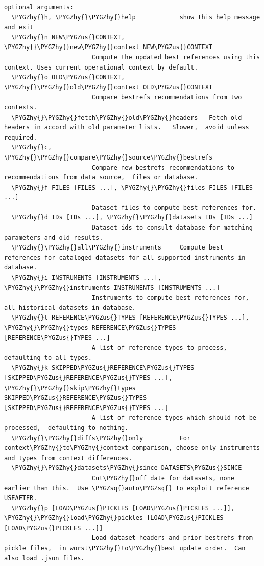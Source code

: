 \documentclass[letterpaper,10pt,english]{sphinxmanual}
\def\PYGZus{\char`\_}
\def\PYGZhy{\char`\-}
\def\PYGZsq{\char`\'}
\begin{document}
\begin{Verbatim}[commandchars=\\\{\}]
optional arguments:
  \PYGZhy{}h, \PYGZhy{}\PYGZhy{}help            show this help message and exit
  \PYGZhy{}n NEW\PYGZus{}CONTEXT, \PYGZhy{}\PYGZhy{}new\PYGZhy{}context NEW\PYGZus{}CONTEXT
                        Compute the updated best references using this context. Uses current operational context by default.
  \PYGZhy{}o OLD\PYGZus{}CONTEXT, \PYGZhy{}\PYGZhy{}old\PYGZhy{}context OLD\PYGZus{}CONTEXT
                        Compare bestrefs recommendations from two contexts.
  \PYGZhy{}\PYGZhy{}fetch\PYGZhy{}old\PYGZhy{}headers   Fetch old headers in accord with old parameter lists.   Slower,  avoid unless required.
  \PYGZhy{}c, \PYGZhy{}\PYGZhy{}compare\PYGZhy{}source\PYGZhy{}bestrefs
                        Compare new bestrefs recommendations to recommendations from data source,  files or database.
  \PYGZhy{}f FILES [FILES ...], \PYGZhy{}\PYGZhy{}files FILES [FILES ...]
                        Dataset files to compute best references for.
  \PYGZhy{}d IDs [IDs ...], \PYGZhy{}\PYGZhy{}datasets IDs [IDs ...]
                        Dataset ids to consult database for matching parameters and old results.
  \PYGZhy{}\PYGZhy{}all\PYGZhy{}instruments     Compute best references for cataloged datasets for all supported instruments in database.
  \PYGZhy{}i INSTRUMENTS [INSTRUMENTS ...], \PYGZhy{}\PYGZhy{}instruments INSTRUMENTS [INSTRUMENTS ...]
                        Instruments to compute best references for, all historical datasets in database.
  \PYGZhy{}t REFERENCE\PYGZus{}TYPES [REFERENCE\PYGZus{}TYPES ...], \PYGZhy{}\PYGZhy{}types REFERENCE\PYGZus{}TYPES [REFERENCE\PYGZus{}TYPES ...]
                        A list of reference types to process,  defaulting to all types.
  \PYGZhy{}k SKIPPED\PYGZus{}REFERENCE\PYGZus{}TYPES [SKIPPED\PYGZus{}REFERENCE\PYGZus{}TYPES ...], \PYGZhy{}\PYGZhy{}skip\PYGZhy{}types SKIPPED\PYGZus{}REFERENCE\PYGZus{}TYPES [SKIPPED\PYGZus{}REFERENCE\PYGZus{}TYPES ...]
                        A list of reference types which should not be processed,  defaulting to nothing.
  \PYGZhy{}\PYGZhy{}diffs\PYGZhy{}only          For context\PYGZhy{}to\PYGZhy{}context comparison, choose only instruments and types from context differences.
  \PYGZhy{}\PYGZhy{}datasets\PYGZhy{}since DATASETS\PYGZus{}SINCE
                        Cut\PYGZhy{}off date for datasets, none earlier than this.  Use \PYGZsq{}auto\PYGZsq{} to exploit reference USEAFTER.
  \PYGZhy{}p [LOAD\PYGZus{}PICKLES [LOAD\PYGZus{}PICKLES ...]], \PYGZhy{}\PYGZhy{}load\PYGZhy{}pickles [LOAD\PYGZus{}PICKLES [LOAD\PYGZus{}PICKLES ...]]
                        Load dataset headers and prior bestrefs from pickle files,  in worst\PYGZhy{}to\PYGZhy{}best update order.  Can also load .json files.

\end{Verbatim}
\end{document}
